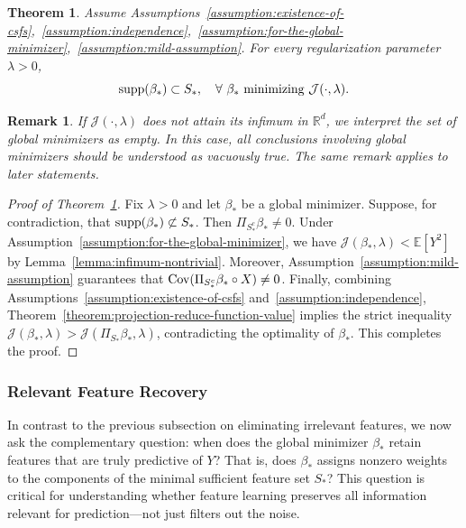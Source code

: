\documentclass[sn-mathphys-num]{sn-jnl}%
\numberwithin{equation}{section}
\newcommand{\R}{\mathbb{R}}
\newcommand{\E}{\mathbb{E}}
\newcommand{\Cov}{{\rm Cov}}
\newcommand{\supp}{\mathop{\rm supp}}
\theoremstyle{thmstyleone}%
\newtheorem{theorem}{Theorem}%
\theoremstyle{thmstyletwo}%
\newtheorem{remark}{Remark}%
\theoremstyle{thmstylethree}%
\begin{document}
\vspace{.5em} 
\begin{theorem}
\label{theorem:global-minimizer}
Assume Assumptions~\ref{assumption:existence-of-csfs},~\ref{assumption:independence},~\ref{assumption:for-the-global-minimizer},~\ref{assumption:mild-assumption}. 
For every regularization parameter $\lambda > 0$,  
\begin{equation*}
	\supp(\beta_*) \subset S_*,~~~\forall~\beta_*~\text{minimizing}~\mathcal{J}(\cdot, \lambda).
\end{equation*}
\end{theorem} 
\begin{remark}
\emph{
If $\mathcal{J}(\cdot, \lambda)$ does not attain its infimum in $\R^d$, we interpret the set of global minimizers as empty. In this case, all conclusions involving global minimizers should be understood as vacuously true. The same remark applies to later statements.
}
\end{remark}

\begin{proof}[Proof of Theorem~\ref{theorem:global-minimizer}]
Fix $\lambda > 0$ and let $\beta_*$ be a global minimizer. Suppose, for contradiction, that 
$\supp(\beta_*) \not  \subset S_*$. Then $\Pi_{S_*^c} \beta_* \ne 0$. 
Under Assumption~\ref{assumption:for-the-global-minimizer}, we have
$\mathcal{J}(\beta_*, \lambda) < \E[Y^2]$ by Lemma~\ref{lemma:infimum-nontrivial}.
Moreover, Assumption~\ref{assumption:mild-assumption} guarantees that
$\Cov(\Pi_{S_*^c} \beta_* \circ X) \ne 0$.
Finally, combining Assumptions~\ref{assumption:existence-of-csfs} and~\ref{assumption:independence},
Theorem~\ref{theorem:projection-reduce-function-value} implies the strict inequality $\mathcal{J}(\beta_*, \lambda) > \mathcal{J}(\Pi_{S_*} \beta_*, \lambda)$, contradicting the optimality of $\beta_*$. This completes the proof.
\end{proof} 



\subsubsection{Relevant Feature Recovery} 
In contrast to the previous subsection on eliminating irrelevant features, we now ask the complementary question: when does the global minimizer $\beta_*$ retain features that are truly predictive of $Y$? That is, does $\beta_*$ assigns nonzero weights to the components of the minimal sufficient feature set $S_*$? This question is critical for understanding whether feature learning preserves all information relevant for prediction---not just filters out the noise.
\end{document}
